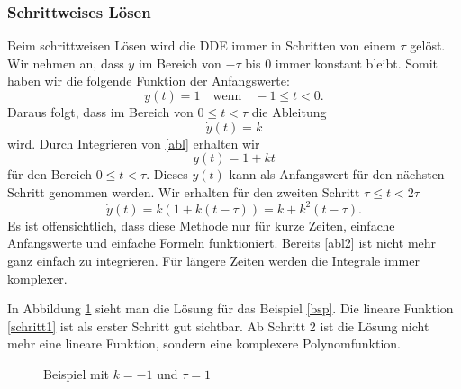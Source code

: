 \subsubsection{Schrittweises Lösen}
Beim schrittweisen Lösen wird die DDE immer in Schritten von einem $\tau$ gelöst.
Wir nehmen an, dass $y$ im Bereich von $-\tau$ bis $0$ immer konstant bleibt.
Somit haben wir die folgende Funktion der Anfangswerte:
\begin{equation}
	y(t)=1 \quad\text{wenn}\quad -1\le t<0.
\end{equation}
Daraus folgt, dass im Bereich von $0\le t<\tau$ die Ableitung
\begin{equation}\label{abl}
	\dot{y}(t)=k
\end{equation}
wird. Durch Integrieren von \eqref{abl} erhalten wir
\begin{equation}\label{schritt1}
	y(t)=1+kt
\end{equation}
für den Bereich $0\le t<\tau$. 
Dieses $y(t)$ kann als Anfangswert für den nächsten Schritt genommen werden.
Wir erhalten für den zweiten Schritt  $\tau\le t<2\tau$ 
\begin{equation}\label{abl2}
	\dot{y}(t)=k(1+k(t-\tau))=k+k^2(t-\tau).
\end{equation}
Es ist offensichtlich, dass diese Methode nur für kurze Zeiten, einfache Anfangswerte und einfache Formeln funktioniert. 
Bereits \eqref{abl2} ist nicht mehr ganz einfach zu integrieren. 
Für längere Zeiten werden die Integrale immer komplexer.

In Abbildung \ref{fig:bsp} sieht man die Lösung für das Beispiel \eqref{bsp}. 
Die lineare Funktion \eqref{schritt1} ist als erster Schritt gut sichtbar.
Ab Schritt 2 ist die Lösung nicht mehr eine lineare Funktion, sondern eine komplexere Polynomfunktion. 
\begin{figure}
	\centering
	
	\caption{Beispiel mit $k=-1$ und $\tau=1$}
	\label{fig:bsp}
\end{figure}

